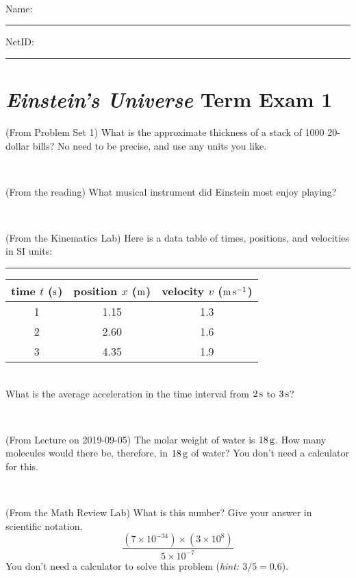 \documentclass[12pt, letterpaper]{article}
\begin{document}
\vfill ~


\cleardoublepage



\noindent
Name: \rule[-1ex]{0.60\textwidth}{0.1pt}
NetID: \rule[-1ex]{0.20\textwidth}{0.1pt}

\section*{\textsl{Einstein's Universe} Term Exam 1}
\setcounter{problem}{1}


\begin{problem} (From Problem Set 1)
What is the approximate thickness of a stack of 1000 20-dollar bills?
No need to be precise, and use any units you like.
\end{problem}


\vfill ~

\begin{problem} (From the reading)
What musical instrument did Einstein most enjoy playing?
\end{problem}


\vfill ~

\begin{problem} (From the Kinematics Lab)
Here is a data table of times, positions, and velocities in SI units:\\
\rule{1.0in}{0pt}\begin{tabular}{c|c|c}
time $t$ ($\mathrm{s}$) & position $x$ ($\mathrm{m}$) & velocity $v$ ($\mathrm{m}\,\mathrm{s}^{-1}$) \\
\hline
1 & 1.15 & 1.3 \\
2 & 2.60 & 1.6 \\
3 & 4.35 & 1.9 \\
\hline
\end{tabular}\\
What is the average acceleration in the time interval from $2\,\mathrm{s}$ to $3\,\mathrm{s}$?
\end{problem}


\vfill ~

\begin{problem} (From Lecture on 2019-09-05)
The molar weight of water is $18\,\mathrm{g}$. How many molecules would there
be, therefore, in $18\,\mathrm{g}$ of water? You don't need a calculator for
this.
\end{problem}


\vfill ~


\clearpage


\begin{problem} (From the Math Review Lab)
What is this number? Give your answer in scientific notation.
$$
\frac{(7\times10^{-34})\times(3\times10^8)}{5\times10^{-7}}
$$
You don't need a calculator to solve this problem (\textit{hint: $3/5=0.6$}).
\end{problem}
\end{document}
